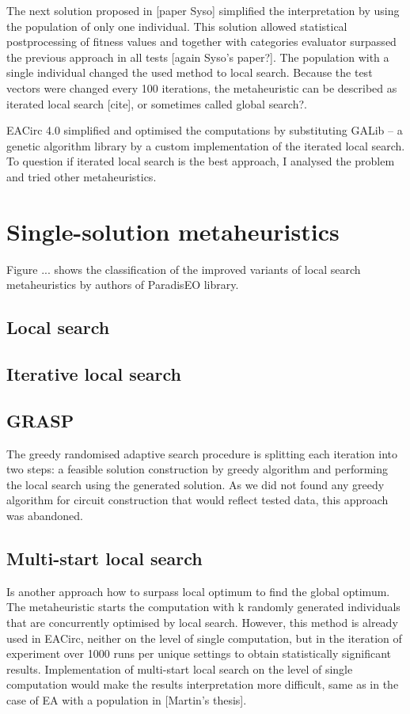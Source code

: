 \documentclass[
  print, %
  Table,   %
  nolof,     %
  nolot,     %
  11pt, %
  oneside  %
]{fithesis3}
\begin{document}
The next solution proposed in [paper Syso] simplified the interpretation by using the population of only one individual. This solution allowed statistical postprocessing of fitness values and together with categories evaluator surpassed the previous approach in all tests [again Syso's paper?]. The population with a single individual changed the used method to local search. Because the test vectors were changed every 100 iterations, the metaheuristic can be described as iterated local search [cite], or sometimes called global search?.

EACirc 4.0 simplified and optimised the computations by substituting GALib -- a genetic algorithm library by a custom implementation of the iterated local search.  To question if iterated local search is the best approach, I analysed the problem and tried other metaheuristics.

\section{Single-solution metaheuristics}

Figure ... shows the classification of the improved variants of local search metaheuristics by authors of ParadisEO library.

\subsection{Local search}
\subsection{Iterative local search}
\subsection{GRASP}

The greedy randomised adaptive search procedure is splitting each iteration into two steps: a feasible solution construction by greedy algorithm and performing the local search using the generated solution. As we did not found any greedy algorithm for circuit construction that would reflect tested data, this approach was abandoned.

\subsection{Multi-start local search}

Is another approach how to surpass local optimum to find the global optimum. The metaheuristic starts the computation with k randomly generated individuals that are concurrently optimised by local search. However, this method is already used in EACirc, neither on the level of single computation, but in the iteration of experiment over 1000 runs per unique settings to obtain statistically significant results. Implementation of multi-start local search on the level of single computation would make the results interpretation more difficult, same as in the case of EA with a population in [Martin's thesis].
\end{document}
